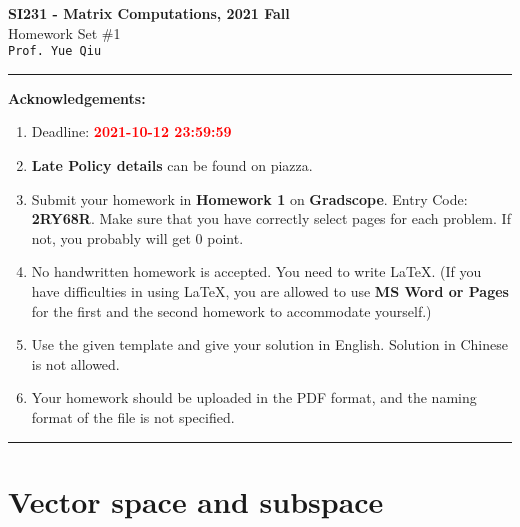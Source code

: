 \documentclass[english,onecolumn]{IEEEtran}
\begin{document}
\begin{center}
	\textbf{\LARGE{SI231 - Matrix Computations, 2021 Fall}}\\
	{\Large Homework Set \#1}\\
	\texttt{Prof. Yue Qiu}
\par\end{center}

\noindent
\rule{\linewidth}{0.4pt}
{\bf Acknowledgements:}
\begin{enumerate}
	\item Deadline: {\bf \textcolor{red}{2021-10-12 23:59:59}}
	\item \textbf{Late Policy details} can be found on piazza.
	\item Submit your homework in \textbf{Homework 1} on \textbf{Gradscope}. Entry Code: \textbf{2RY68R}. Make sure that you have correctly select pages for each problem. If not, you probably will get 0 point.
	\item No handwritten homework is accepted. You need to write \LaTeX. (If you have difficulties in using \LaTeX, you are allowed to use \textbf{MS Word or Pages} for the first and the second homework to accommodate yourself.)
	\item Use the given template and give your solution in English. Solution in Chinese is not allowed.
	\item Your homework should be uploaded in the PDF format, and the naming format of the file is not specified.
\end{enumerate}
\rule{\linewidth}{0.4pt}

\section{Vector space and subspace}
\end{document}
